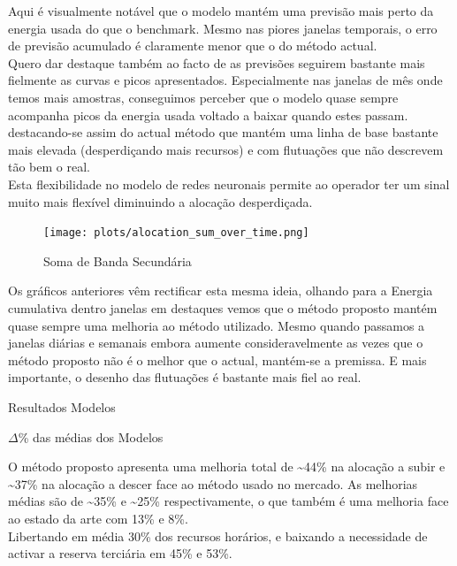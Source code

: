 Aqui é visualmente notável que o modelo mantém uma previsão mais perto da energia usada do que o benchmark. Mesmo nas piores janelas temporais, o erro de previsão acumulado é claramente menor que o do método actual.\\
Quero dar destaque também ao facto de as previsões seguirem bastante mais fielmente as curvas e picos apresentados. Especialmente nas janelas de mês onde temos mais amostras, conseguimos perceber que o modelo quase sempre acompanha picos da energia usada voltado a baixar quando estes passam. destacando-se assim do actual método que mantém uma linha de base bastante mais elevada (desperdiçando mais recursos) e com flutuações que não descrevem tão bem o real. \\
Esta flexibilidade no modelo de redes neuronais permite ao operador ter um sinal muito mais flexível diminuindo a alocação desperdiçada.\\

\begin{figure}[H]
    \centering
    \texttt{[image: plots/alocation\_sum\_over\_time.png]}
    \caption{Soma de Banda Secundária}
    \label{fig:mltimewindowssum}
\end{figure}

Os gráficos anteriores vêm rectificar esta mesma ideia, olhando para a Energia cumulativa dentro janelas em destaques vemos que o método proposto mantém quase sempre uma melhoria ao método utilizado. Mesmo quando passamos a janelas diárias e semanais embora aumente consideravelmente as vezes que o método proposto não é o melhor que o actual, mantém-se a premissa. E mais importante, o desenho das flutuações é bastante mais fiel ao real.\\


\begin{table}[H]
    \caption{Resultados Modelos}    
    \resizebox{\linewidth}{!}{}
    \label{tab:mlres}
    \end{table}



\begin{table}[H]
    \caption{$\Delta$\% das médias dos Modelos}    
    \resizebox{\linewidth}{!}{}
    \label{tab:mlres_deltas}
    \end{table}

O método proposto apresenta uma melhoria total de \textasciitilde44\% na alocação a subir e \textasciitilde37\% na alocação a descer face ao método usado no mercado. As melhorias médias são de \textasciitilde35\% e \textasciitilde25\% respectivamente, o que também é uma melhoria face ao estado da arte \cite{Algarvio2024} com 13\% e 8\%.\\
Libertando em média 30\% dos recursos horários, e baixando a necessidade de activar a reserva terciária em 45\% e 53\%. \\

